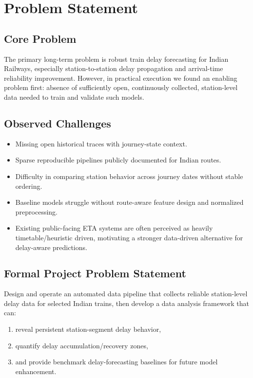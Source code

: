 \documentclass[12pt,a4paper]{report}
\begin{document}
\chapter{Problem Statement}

\section{Core Problem}
The primary long-term problem is robust train delay forecasting for Indian Railways, especially station-to-station delay propagation and arrival-time reliability improvement. However, in practical execution we found an enabling problem first: absence of sufficiently open, continuously collected, station-level data needed to train and validate such models.

\section{Observed Challenges}
\begin{itemize}
    \item Missing open historical traces with journey-state context.
    \item Sparse reproducible pipelines publicly documented for Indian routes.
    \item Difficulty in comparing station behavior across journey dates without stable ordering.
    \item Baseline models struggle without route-aware feature design and normalized preprocessing.
    \item Existing public-facing ETA systems are often perceived as heavily timetable/heuristic driven, motivating a stronger data-driven alternative for delay-aware predictions.
\end{itemize}

\section{Formal Project Problem Statement}
Design and operate an automated data pipeline that collects reliable station-level delay data for selected Indian trains, then develop a data analysis framework that can:
\begin{enumerate}
    \item reveal persistent station-segment delay behavior,
    \item quantify delay accumulation/recovery zones,
    \item and provide benchmark delay-forecasting baselines for future model enhancement.
\end{enumerate}
\end{document}
